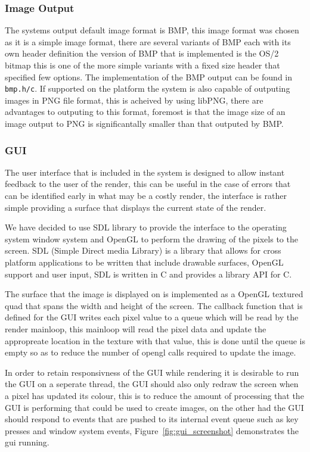 \subsubsection{Image Output}

The systems output default image format is BMP, this image format was chosen as it is a simple image format, there are
several variants of BMP each with its own header definition the version of BMP that is implemented is the OS/2 bitmap this is
one of the more simple variants with a fixed size header that specified few options. The implementation of the BMP output can
be found in \texttt{bmp.h/c}. If supported on the platform the system is also capable of outputing images in PNG file format,
this is acheived by using libPNG, there are advantages to outputing to this format, foremost is that the image size of an
image output to PNG is significantally smaller than that outputed by BMP.

\subsubsection{GUI}

The user interface that is included in the system is designed to allow instant feedback to the user of the render, this can be
useful in the case of errors that can be identified early in what may be a costly render, the interface is rather simple
providing a surface that displays the current state of the render.

We have decided to use SDL library to provide the interface to the operating system window system and OpenGL to perform the 
drawing of the pixels to the screen. SDL (Simple Direct media Library) is a library that allows for cross platform applications to be written that include
drawable surfaces, OpenGL support and user input, SDL is written in C and provides a library API for C.

The surface that the image is displayed on is implemented as a OpenGL textured quad that spans the width and height of the screen.
The callback function that is defined for the GUI writes each pixel value to a queue which will be read by the render mainloop,
this mainloop will read the pixel data and update the appropreate location in the texture with that value, this is done until the
queue is empty so as to reduce the number of opengl calls required to update the image. 

In order to retain responsivness of the GUI while rendering it is desirable to run the GUI on a seperate thread, the GUI
should also only redraw the screen when a pixel has updated its colour, this is to reduce the amount of processing that
the GUI is performing that could be used to create images, on the other had the GUI should respond to events that are pushed
to its internal event queue such as key presses and window system events, Figure~\ref{fig:gui_screenshot} demonstrates the
gui running.

